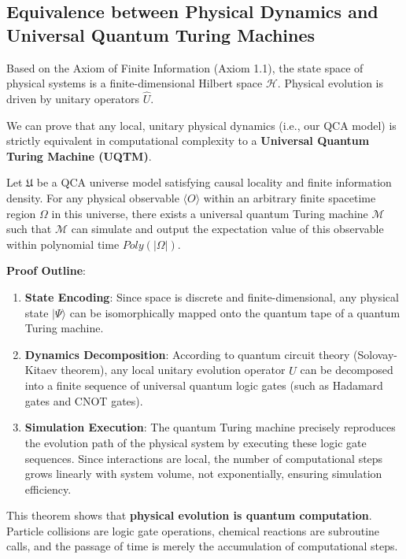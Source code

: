 \subsection{Equivalence between Physical Dynamics and Universal Quantum Turing Machines}

Based on the Axiom of Finite Information (Axiom 1.1), the state space of physical systems is a finite-dimensional Hilbert space $\mathcal{H}$. Physical evolution is driven by unitary operators $\hat{U}$.

We can prove that any local, unitary physical dynamics (i.e., our QCA model) is strictly equivalent in computational complexity to a \textbf{Universal Quantum Turing Machine (UQTM)}.

\begin{theorem}
Let $\mathfrak{U}$ be a QCA universe model satisfying causal locality and finite information density. For any physical observable $\langle O \rangle$ within an arbitrary finite spacetime region $\Omega$ in this universe, there exists a universal quantum Turing machine $\mathcal{M}$ such that $\mathcal{M}$ can simulate and output the expectation value of this observable within polynomial time $Poly(|\Omega|)$.
\end{theorem}

\textbf{Proof Outline}:

\begin{enumerate}
\item \textbf{State Encoding}: Since space is discrete and finite-dimensional, any physical state $|\Psi\rangle$ can be isomorphically mapped onto the quantum tape of a quantum Turing machine.

\item \textbf{Dynamics Decomposition}: According to quantum circuit theory (Solovay-Kitaev theorem), any local unitary evolution operator $\hat{U}$ can be decomposed into a finite sequence of universal quantum logic gates (such as Hadamard gates and CNOT gates).

\item \textbf{Simulation Execution}: The quantum Turing machine precisely reproduces the evolution path of the physical system by executing these logic gate sequences. Since interactions are local, the number of computational steps grows linearly with system volume, not exponentially, ensuring simulation efficiency.
\end{enumerate}

This theorem shows that \textbf{physical evolution is quantum computation}. Particle collisions are logic gate operations, chemical reactions are subroutine calls, and the passage of time is merely the accumulation of computational steps.


